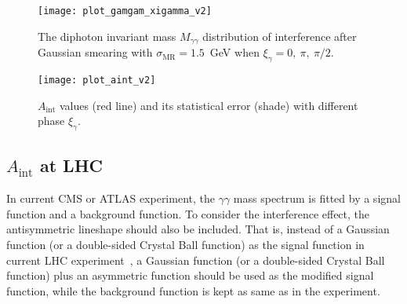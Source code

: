\documentclass[twocolumn,
prd,amssymb,amsmath,preprintnumbers,
floatfix,aps,nofootinbib]{revtex4-1}
\begin{document}
\begin{figure}[tbp]
\begin{center}
\texttt{[image: plot\_gamgam\_xigamma\_v2]}
\end{center}
\caption{ The diphoton invariant mass $M_{\gamma\gamma}$ distribution
of interference after Gaussian smearing with $\sigma_{\text{MR}}=1.5$~GeV
 when $\xi_\gamma=0,~\pi,~\pi/2$.
}
\label{fig:xigamma}
\end{figure}

\begin{figure}[tbp]
\begin{center}
\texttt{[image: plot\_aint\_v2]}
\end{center}
\caption{ $A_{\text{int}}$ values (red line) and its statistical error (shade)
with different phase $\xi_\gamma$.
}
\label{fig:aint}
\end{figure}

\subsection{$A_{\text{int}}$ at LHC}

In current CMS or ATLAS experiment, the $\gamma\gamma$ mass spectrum is fitted
by a signal function and a background function. To consider the interference effect, the antisymmetric lineshape should also be included.
That is, instead of
a Gaussian function (or a double-sided Crystal Ball function) as the signal function in current LHC experiment~\cite{CMS:2017rli,Aaboud:2018xdt},
 a Gaussian function (or a double-sided Crystal Ball function) plus an asymmetric function should be used as the modified signal function, while the background function is kept as same as in the experiment.
\end{document}
